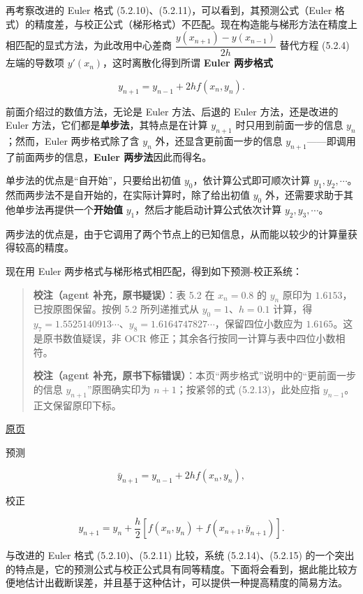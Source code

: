 \documentclass[
  10pt,
  fontset=fandol]{ctexart}
\begin{document}
再考察改进的 Euler 格式 (5.2.10)、(5.2.11)，可以看到，其预测公式（Euler 格式）的精度差，与校正公式（梯形格式）不匹配。现在构造能与梯形方法在精度上相匹配的显式方法，为此改用中心差商 \(\dfrac{y(x_{n+1})-y(x_{n-1})}{2h}\) 替代方程 (5.2.4) 左端的导数项 \(y'(x_n)\)，这时离散化得到所谓 \textbf{Euler 两步格式}

\[
y_{n+1}=y_{n-1}+2hf(x_n,y_n).\tag{5.2.13}
\]

前面介绍过的数值方法，无论是 Euler 方法、后退的 Euler 方法，还是改进的 Euler 方法，它们都是\textbf{单步法}，其特点是在计算 \(y_{n+1}\) 时只用到前面一步的信息 \(y_n\)；然而，Euler 两步格式除了含 \(y_n\) 外，还显含更前面一步的信息 \(y_{n+1}\)------即调用了前面两步的信息，\textbf{Euler 两步法}因此而得名。

单步法的优点是``自开始''，只要给出初值 \(y_0\)，依计算公式即可顺次计算 \(y_1,y_2,\cdots\)。然而两步法不是自开始的，在实际计算时，除了给出初值 \(y_0\) 外，还需要求助于其他单步法再提供一个\textbf{开始值} \(y_1\)，然后才能启动计算公式依次计算 \(y_2,y_3,\cdots\)。

两步法的优点是，由于它调用了两个节点上的已知信息，从而能以较少的计算量获得较高的精度。

现在用 Euler 两步格式与梯形格式相匹配，得到如下预测-校正系统：

\begin{quote}
\textbf{校注（agent 补充，原书疑误）}：表 5.2 在 \(x_n=0.8\) 的 \(y_n\) 原印为 \(1.6153\)，已按原图保留。按例 5.2 所列递推式从 \(y_0=1\)、\(h=0.1\) 计算，得 \(y_7=1.5525140913\cdots\)、\(y_8=1.6164747827\cdots\)，保留四位小数应为 \(1.6165\)。这是原书数值疑误，非 OCR 修正；其余各行按同一计算与表中四位小数相符。

\textbf{校注（agent 补充，原书下标错误）}：本页``两步格式''说明中的``更前面一步的信息 \(y_{n+1}\)''原图确实印为 \(n+1\)；按紧邻的式 (5.2.13)，此处应指 \(y_{n-1}\)。正文保留原印下标。
\end{quote}

\href{../../source-images/pdf-125.jpeg}{原页}

预测

\[
\bar y_{n+1}=y_{n-1}+2hf(x_n,y_n),\tag{5.2.14}
\]

校正

\[
y_{n+1}=y_n+\frac{h}{2}[f(x_n,y_n)+f(x_{n+1},\bar y_{n+1})].\tag{5.2.15}
\]

与改进的 Euler 格式 (5.2.10)、(5.2.11) 比较，系统 (5.2.14)、(5.2.15) 的一个突出的特点是，它的预测公式与校正公式具有同等精度。下面将会看到，据此能比较方便地估计出截断误差，并且基于这种估计，可以提供一种提高精度的简易方法。
\end{document}
